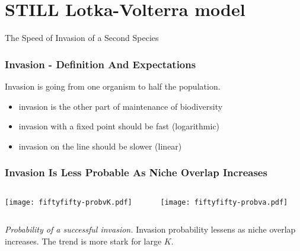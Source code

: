 \documentclass{beamer}
\begin{document}
\section[Invasion]{STILL Lotka-Volterra model}

\begin{frame}
\centering
{{\Huge The Speed of Invasion of a Second Species}}
\end{frame}


\begin{frame}
\frametitle{Invasion - Definition And Expectations}
Invasion is going from one organism to half the population. %
\begin{itemize}
	\item invasion is the other part of maintenance of biodiversity
	\pause
	\item invasion with a fixed point should be fast (logarithmic)
	\pause
	\item invasion on the line should be slower (linear)
\end{itemize}
\end{frame}


\begin{frame}
\frametitle{Invasion Is Less Probable As Niche Overlap Increases}
\begin{columns}
	\begin{column}{5.5cm}
		\begin{center}
			\texttt{[image: fiftyfifty-probvK.pdf]}
		\end{center}
	\end{column}
	\begin{column}{5.5cm}
		\begin{center}
			\texttt{[image: fiftyfifty-probva.pdf]}
		\end{center}
	\end{column}
\end{columns}
\justifying
	\emph{Probability of a successful invasion.}
	Invasion probability lessens as niche overlap increases. The trend is more stark for large $K$. %
\end{frame}
\end{document}
